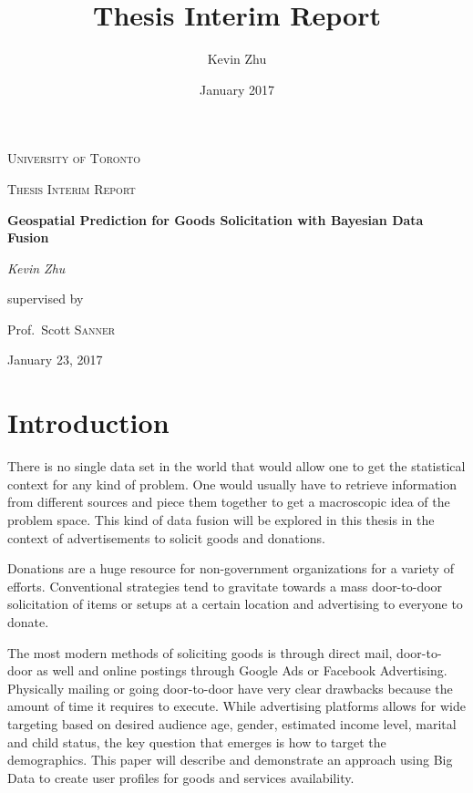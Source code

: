 \documentclass[12pt]{article}
\title{Thesis Interim Report}
\date{January 2017}
\author{Kevin Zhu}
\begin{document}
\begin{titlepage}
   \centering
   {\scshape\LARGE University of Toronto \par}
   \vspace{1cm}
   {\scshape\Large Thesis Interim Report\par}
   \vspace{1.5cm}
   {\huge\bfseries Geospatial Prediction for Goods Solicitation with Bayesian Data Fusion\par}
   \vspace{2cm}
   {\Large\itshape Kevin Zhu\par}
   \vfill
   supervised by\par
   Prof.~Scott \textsc{Sanner}
   \vfill
   {\large January 23, 2017\par}
\end{titlepage}

\newpage
\tableofcontents
\newpage

\section{Introduction}

There is no single data set in the world that would allow one to get the statistical context for any kind of problem. One would usually have to retrieve information from different sources and piece them together to get a macroscopic idea of the problem space. This kind of data fusion will be explored in this thesis in the context of advertisements to solicit goods and donations. 

Donations are a huge resource for non-government organizations for a variety of efforts. %
Conventional strategies tend to gravitate towards a mass door-to-door solicitation of items or setups at a certain location and advertising to everyone to donate. %

   The most modern methods of soliciting goods is through direct mail, door-to-door as well and online postings through Google Ads or Facebook Advertising. Physically mailing or going door-to-door have very clear drawbacks because the amount of time it requires to execute. While advertising platforms allows for wide targeting based on desired audience age, gender, estimated income level, marital and child status, the key question that emerges is how to target the demographics. This paper will describe and demonstrate an approach using Big Data to create user profiles for goods and services availability. 
\end{document}
